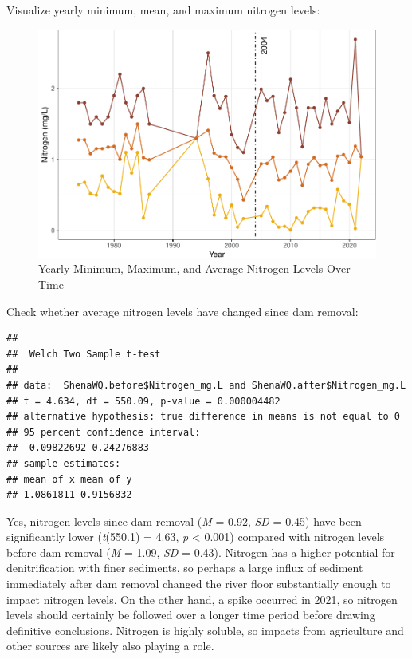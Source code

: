 \documentclass[
  12pt,
]{article}
\begin{document}
Visualize yearly minimum, mean, and maximum nitrogen levels:

\begin{figure}
\centering
\includegraphics{Project_Script_files/figure-latex/Nitrogen_Analysis3-1.pdf}
\caption{Yearly Minimum, Maximum, and Average Nitrogen Levels Over Time}
\end{figure}

Check whether average nitrogen levels have changed since dam removal:

\begin{verbatim}
## 
##  Welch Two Sample t-test
## 
## data:  ShenaWQ.before$Nitrogen_mg.L and ShenaWQ.after$Nitrogen_mg.L
## t = 4.634, df = 550.09, p-value = 0.000004482
## alternative hypothesis: true difference in means is not equal to 0
## 95 percent confidence interval:
##  0.09822692 0.24276883
## sample estimates:
## mean of x mean of y 
## 1.0861811 0.9156832
\end{verbatim}

Yes, nitrogen levels since dam removal (\emph{M} = 0.92, \emph{SD} =
0.45) have been significantly lower (\emph{t}(550.1) = 4.63, \emph{p}
\textless{} 0.001) compared with nitrogen levels before dam removal
(\emph{M} = 1.09, \emph{SD} = 0.43). Nitrogen has a higher potential for
denitrification with finer sediments, so perhaps a large influx of
sediment immediately after dam removal changed the river floor
substantially enough to impact nitrogen levels. On the other hand, a
spike occurred in 2021, so nitrogen levels should certainly be followed
over a longer time period before drawing definitive conclusions.
Nitrogen is highly soluble, so impacts from agriculture and other
sources are likely also playing a role.
\end{document}
